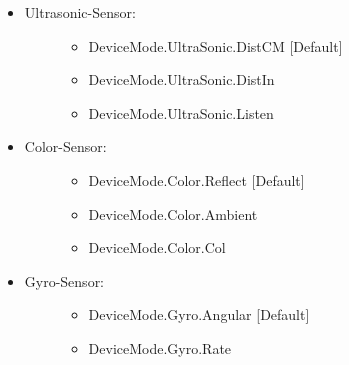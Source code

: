 \documentclass[letterpaper,10pt,english]{sphinxmanual}
\begin{document}
\begin{fulllineitems}
\begin{fulllineitems}
\begin{itemize}
\begin{description}
\end{description}

\item {} \begin{description}
\item[{Ultrasonic-Sensor:}] \leavevmode\begin{itemize}
\item {} 
DeviceMode.UltraSonic.DistCM {[}Default{]}

\item {} 
DeviceMode.UltraSonic.DistIn

\item {} 
DeviceMode.UltraSonic.Listen

\end{itemize}

\end{description}

\item {} \begin{description}
\item[{Color-Sensor:}] \leavevmode\begin{itemize}
\item {} 
DeviceMode.Color.Reflect {[}Default{]}

\item {} 
DeviceMode.Color.Ambient

\item {} 
DeviceMode.Color.Col

\end{itemize}

\end{description}

\item {} \begin{description}
\item[{Gyro-Sensor:}] \leavevmode\begin{itemize}
\item {} 
DeviceMode.Gyro.Angular {[}Default{]}

\item {} 
DeviceMode.Gyro.Rate

\end{itemize}

\end{description}

\end{itemize}

\end{fulllineitems}



\end{fulllineitems}
\end{document}
